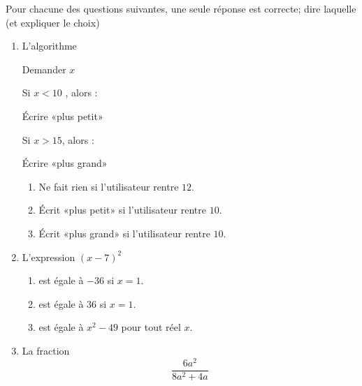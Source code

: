 
\begin{exercice}[\ldots/4]\label{exosmath-0635}

    Pour chacune des questions suivantes, une seule réponse est correcte; dire laquelle (et expliquer le choix)
    \begin{multicols}{2}
    \begin{enumerate}
        \item
           L'algorithme

    \begin{fmpage}{0.9\linewidth}

    Demander \( x\)

    Si  \( x< 10\) , alors :

    \hspace{0.5cm} Écrire «plus petit» 

    Si \( x>15\), alors :

    \hspace{0.5cm} Écrire «plus grand» 

\end{fmpage}

    \begin{enumerate}
        \item
            Ne fait rien si l'utilisateur rentre \( 12\).
        \item
            Écrit «plus petit»  si l'utilisateur rentre \( 10\).
        \item
            Écrit «plus grand» si l'utilisateur rentre \( 10\).
    \end{enumerate}
    
\item

    L'expression \( (x-7)^2\)
    \begin{enumerate}
        \item
            est égale à \( -36\) si \( x=1\).
        \item   \label{ItemPMxYdYQ}
            est égale à \( 36\) si \( x=1\).
        \item
            est égale à \( x^2-49\) pour tout réel \( x\).
    \end{enumerate}
    
\item

    La fraction
    \begin{equation*}
        \frac{ 6a^2 }{ 8a^2+4a }
    \end{equation*}
    

\end{enumerate}
\end{multicols}
\end{exercice}
